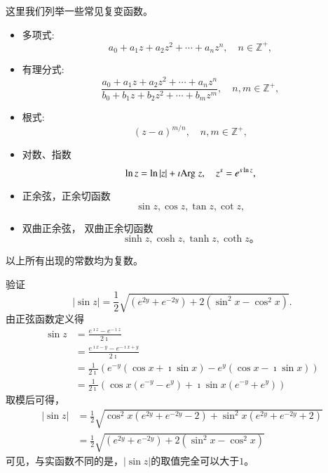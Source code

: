 这里我们列举一些常见复变函数。
\begin{itemize}
    \item 多项式:
        \begin{equation}
            a_0 + a_1 z + a_2 z^2 + \cdots + a_n z^n , \quad n\in \mathbb{Z}^+ ,
        \end{equation}
    \item 有理分式:       
         \begin{equation}
        \frac{a_0 + a_1 z + a_2 z^2 + \cdots + a_n z^n}{{b_0 + b_1 z + b_2 z^2 + \cdots + b_m z^m}} , \quad  n,m\in \mathbb{Z}^+ ,
        \end{equation}
    \item 根式:
        \begin{equation}
            (z-a)^{m/n} , \quad  n,m\in \mathbb{Z}^+ ,
        \end{equation}
    \item 对数、指数
        \begin{equation}
            \ln z = \ln |z| + \imath {\mathrm{Arg}\;} z, \quad z^s = e^{s\ln z} ,
        \end{equation}
    \item 正余弦，正余切函数 
        \begin{equation}
            \sin z , \cos z , \tan z, \cot z ,
        \end{equation}
    \item 双曲正余弦， 双曲正余切函数
        \begin{equation}
            \sinh z , \cosh z , \tanh z, \coth z  \textrm{。}
        \end{equation}
\end{itemize}
以上所有出现的常数均为复数。

\begin{examplebox}{验证\begin{equation*}
    |\sin z|=\frac{1}{2} \sqrt{\left(e^{2 y}+e^{-2 y}\right)+2\left(\sin ^2 x-\cos ^2 x\right)} .
    \end{equation*}
    }
    由正弦函数定义得
    \begin{align*}
        \sin z &= \frac{e^{\imath z} - e^{-\imath z}}{2\imath} 
        \\ 
        & = \frac{e^{\imath x - y} - e^{-\imath x + y}}{2\imath}
        \\
        & = \frac{1}{2\imath}\left( e^{-y} (\cos x + \imath \sin x ) - e^{y} (\cos x - \imath \sin x ) \right) 
        \\
        & = \frac{1}{2\imath} \left( \cos x (e^{-y} - e^{y}) + \imath \sin x (e^{-y} + e^{y}) \right)
    \end{align*}
    取模后可得，
    \begin{align*}
        |\sin z | &= \frac{1}{2}\sqrt{ \cos^2x (e^{2y} + e^{-2y} -2) + \sin^2 x (e^{2y} + e^{-2y} +2) }
        \\
        &=\frac{1}{2}\sqrt{\left(e^{2 y}+e^{-2 y}\right)+2\left(\sin ^2 x-\cos ^2 x\right)}
    \end{align*}
    可见，与实函数不同的是，$|\sin z|$的取值完全可以大于$1$。
\end{examplebox}


